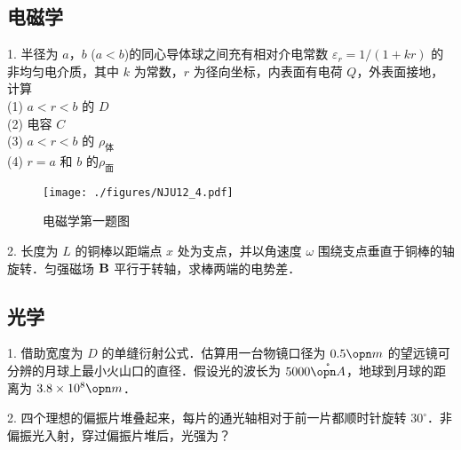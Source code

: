 \subsection{电磁学}
1. 半径为 $a$，$b$ ($a<b$)的同心导体球之间充有相对介电常数 $\varepsilon_r=1/(1+kr)$ 的非均匀电介质，其中 $k$ 为常数，$r$ 为径向坐标，内表面有电荷 $Q$，外表面接地，计算\\
(1) $ a<r<b $ 的 $D$\\
(2) 电容 $C$\\
(3) $ a<r<b $ 的 $\rho_{\text{体}}$\\
(4) $ r=a $ 和 $b$ 的$\rho_{\text{面}}$
\begin{figure}[ht]
\centering
\texttt{[image: ./figures/NJU12\_4.pdf]}
\caption{电磁学第一题图} \label{NJU12_fig4}
\end{figure}
2. 长度为 $L$ 的铜棒以距端点 $x$ 处为支点，并以角速度 $\omega$ 围绕支点垂直于铜棒的轴旋转．匀强磁场 $\bf B$ 平行于转轴，求棒两端的电势差．
\subsection{光学}
1. 借助宽度为 $D$ 的单缝衍射公式．估算用一台物镜口径为 $0.5 \opn m$ 的望远镜可分辨的月球上最小火山口的直径．假设光的波长为 $5000\mathring{\opn A}$，地球到月球的距离为 $3.8\times 10^8 \opn m$．

2. 四个理想的偏振片堆叠起来，每片的通光轴相对于前一片都顺时针旋转 $30^\circ$．非偏振光入射，穿过偏振片堆后，光强为？